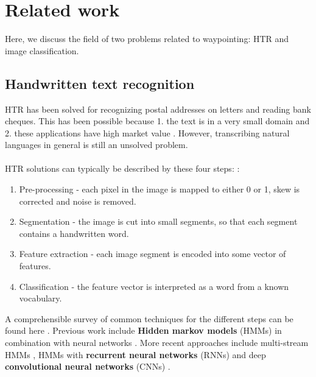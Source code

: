 
\section{Related work}


Here, we discuss the field of two problems related to waypointing: HTR and image classification.

\subsection{Handwritten text recognition}

HTR has been solved for recognizing postal addresses on letters and reading bank cheques. This has been possible because 1. the text is in a very small domain and 2. these applications have high market value \cite{40_years_HWR}. However, transcribing natural languages in general is still an unsolved problem.

\paragraph{}
HTR solutions can typically be described by these four steps: \cite{offline_HWR_CNN}:
\begin{enumerate}
    \item Pre-processing - each pixel in the image is mapped to either 0 or 1, skew is corrected and noise is removed.
    \item Segmentation - the image is cut into small segments, so that each segment contains a handwritten word.
    \item Feature extraction - each image segment is encoded into some vector of features.
    \item Classification - the feature vector is interpreted as a word from a known vocabulary.
\end{enumerate}

A comprehensible survey of common techniques for the different steps can be found here \cite{HWR_survey}.
Previous work include \textbf{Hidden markov models} (HMMs) in combination with neural networks \cite{Offline_HWR_HMM_ANN}.
More recent approaches include multi-stream HMMs \cite{HWR_multi_stream_HMM_arabic}, HMMs with \textbf{recurrent neural networks} (RNNs) \cite{Offline_HWR_RNN} and deep \textbf{convolutional neural networks} (CNNs) \cite{offline_HWR_CNN}.


